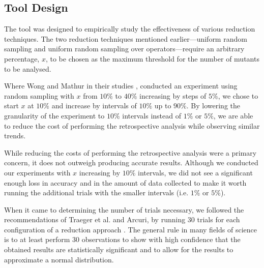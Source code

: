 \subsection{Tool Design}

The \mr tool was designed to empirically study the effectiveness of
various reduction techniques. The two reduction techniques mentioned earlier---uniform random sampling
and uniform random sampling over operators---require an arbitrary percentage, $x$, to be chosen as the maximum threshold
for the number of mutants to be analysed.

Where Wong and Mathur in their studies \cite{mathur1994empirical}, \cite{wong1993mutation} conducted
an experiment using random sampling with $x$ from $10\%$ to $40\%$ increasing by steps of $5\%$, we
chose to start $x$ at $10\%$ and increase by intervals of $10\%$ up to $90\%$. By lowering
the granularity of the experiment to $10\%$ intervals instead of
$1\%$ or $5\%$, we are able to reduce the cost of performing the retrospective analysis while observing
similar trends.

While reducing the costs of performing the retrospective analysis were a primary concern, it does not
outweigh producing accurate results. Although we conducted our experiments with $x$ increasing by
$10\%$ intervals, we did not see a significant enough loss in accuracy and in the amount of data collected to make
it worth running the additional trials with the smaller intervals (i.e. $1\%$ or $5\%$).

When it came to determining the number of trials necessary, we followed
the recommendations of Traeger et al. and Arcuri, by running 30 trials for each configuration of a reduction approach \cite{traeger2008nine, arcuri2014hitchhiker}.
The general rule in many fields of science is to at least perform 30 observations to show with high confidence
that the obtained results are statistically significant and to allow for the results to approximate a normal
distribution.

